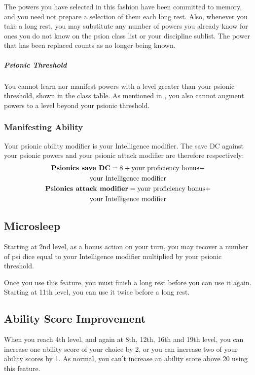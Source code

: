 The powers you have selected in this fashion have been committed
to memory, and you need not prepare a selection of them each long rest.
Also,
whenever you take a long rest,
you may substitute any number of powers you already know
for ones you do not know
on the psion class list or your discipline sublist.
The power that has been replaced counts as no longer being known.

\subparagraph{Psionic Threshold}
You cannot learn nor manifest powers with a level
greater than your psionic threshold,
shown in the class table.
As mentioned in ,
you also cannot augment powers to a level
beyond your psionic threshold.

\subsubsection{Manifesting Ability}
Your psionic ability modifier is your Intelligence modifier.
The save DC against your psionic powers and your
psionic attack modifier are therefore respectively:
\small\begin{equation*}
    \begin{gathered}
        \text{\textbf{Psionics save DC}}
            = 8 + \text{your proficiency bonus} + \\
                  \text{your Intelligence modifier} \\
        \text{\textbf{Psionics attack modifier}}
            = \text{your proficiency bonus} + \\
              \text{your Intelligence modifier}
    \end{gathered}
\end{equation*}\normalsize

\subsection{Microsleep}
Starting at 2nd level,
as a bonus action on your turn,
you may recover a number of psi dice equal to
your Intelligence modifier multiplied by your psionic threshold.

Once you use this feature,
you must finish a long rest before you can use it again.
Starting at 11th level,
you can use it twice before a long rest.

\subsection{Ability Score Improvement}
When you reach 4th level,
and again at 8th, 12th, 16th and 19th level,
you can increase one ability score of your choice by 2,
or you can increase two of your ability scores by 1.
As normal,
you can't increase an ability score above 20 using this feature.


